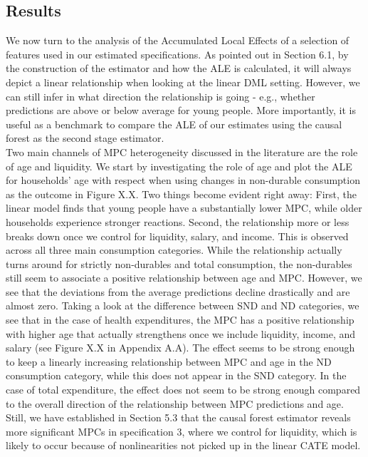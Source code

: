 \subsection{Results}
We now turn to the analysis of the Accumulated Local Effects of a selection of features used in our estimated specifications. As pointed out in Section 6.1, by the construction of the estimator and how the ALE is calculated, it will always depict a linear relationship when looking at the linear DML setting. However, we can still infer in what direction the relationship is going - e.g., whether predictions are above or below average for young people. More importantly, it is useful as a benchmark to compare the ALE of our estimates using the causal forest as the second stage estimator. \\
Two main channels of MPC heterogeneity discussed in the literature are the role of age and liquidity. We start by investigating the role of age and plot the ALE for households' age with respect when using changes in non-durable consumption as the outcome in Figure X.X.
Two things become evident right away: First, the linear model finds that young people have a substantially lower MPC, while older households experience stronger reactions. Second, the relationship more or less breaks down once we control for liquidity, salary, and income. This is observed across all three main consumption categories. While the relationship actually turns around for strictly non-durables and total consumption, the non-durables still seem to associate a positive relationship between age and MPC. However, we see that the deviations from the average predictions decline drastically and are almost zero. Taking a look at the difference between SND and ND categories, we see that in the case of health expenditures, the MPC has a positive relationship with higher age that actually strengthens once we include liquidity, income, and salary (see Figure X.X in Appendix A.A). The effect seems to be strong enough to keep a linearly increasing relationship between MPC and age in the ND consumption category, while this does not appear in the SND category. In the case of total expenditure, the effect does not seem to be strong enough compared to the overall direction of the relationship between MPC predictions and age. \\
Still, we have established in Section 5.3 that the causal forest estimator reveals more significant MPCs in specification 3, where we control for liquidity, which is likely to occur because of nonlinearities not picked up in the linear CATE model. 
